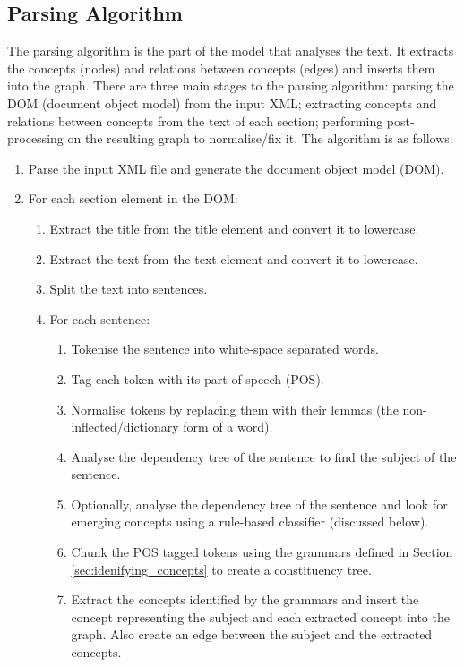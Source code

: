 \documentclass[12pt]{article}
\theoremstyle{grammarstyle}
\begin{document}
\subsection{Parsing Algorithm} \label{sec:parsing_algorithm}
The parsing algorithm is the part of the model that analyses the text. It extracts the concepts (nodes) and relations between concepts (edges) and inserts them into the graph. There are three main stages to the parsing algorithm: parsing the DOM (document object model) from the input XML; extracting concepts and relations between concepts from the text of each section; performing post-processing on the resulting graph to normalise/fix it. The algorithm is as follows:
\begin{enumerate}
    \item Parse the input XML file and generate the document object model (DOM).
    \item For each section element in the DOM:
    \begin{enumerate}
        \item Extract the title from the title element and convert it to lowercase.
        \item Extract the text from the text element and convert it to lowercase.
        \item Split the text into sentences.
        \item For each sentence:
        \begin{enumerate}
            \item Tokenise the sentence into white-space separated words.
            \item Tag each token with its part of speech (POS).
            \item Normalise tokens by replacing them with their lemmas (the non-inflected/dictionary form of a word).
            \item Analyse the dependency tree of the sentence to find the subject of the sentence.
            \item Optionally, analyse the dependency tree of the sentence and look for emerging concepts using a rule-based classifier (discussed below).
            \item Chunk the POS tagged tokens using the grammars defined in Section \ref{sec:idenifying_concepts} to create a constituency tree.
            \item Extract the concepts identified by the grammars and insert the concept representing the subject and each extracted concept into the graph. Also create an edge between the subject and the extracted concepts.

\end{enumerate}
\end{enumerate}
\end{enumerate}
\end{document}
